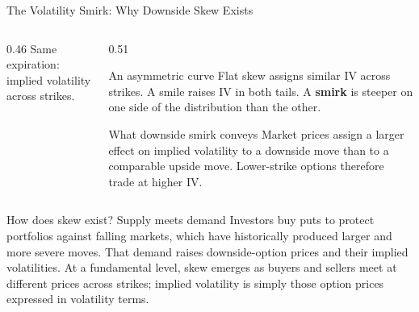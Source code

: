 \documentclass[aspectratio=169,10pt]{beamer}
\begin{document}
\begin{frame}{The Volatility Smirk: Why Downside Skew Exists}
\begin{columns}[T,onlytextwidth]
\begin{column}{0.46\textwidth}
      {\scriptsize Same expiration: implied volatility across strikes.}
    \end{column}
    \begin{column}{0.51\textwidth}
      \small
      \begin{block}{An asymmetric curve}
        Flat skew assigns similar IV across strikes. A smile raises IV in both tails. A \textbf{smirk} is steeper on one side of the distribution than the other.
      \end{block}
      \begin{block}{What downside smirk conveys}
        Market prices assign a larger effect on implied volatility to a downside move than to a comparable upside move. Lower-strike options therefore trade at higher IV.
      \end{block}
    \end{column}
  \end{columns}
  \vspace{0.08cm}
  \scriptsize
  \begin{block}{How does skew exist? Supply meets demand}
    Investors buy puts to protect portfolios against falling markets, which have historically produced larger and more severe moves. That demand raises downside-option prices and their implied volatilities. At a fundamental level, skew emerges as buyers and sellers meet at different prices across strikes; implied volatility is simply those option prices expressed in volatility terms.
  \end{block}
\end{frame}
\end{document}
